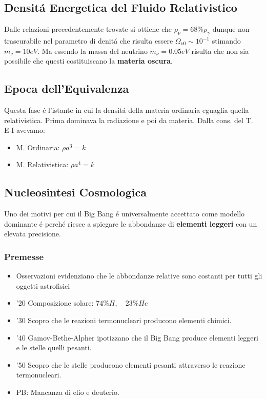 \documentclass[12pt, a4paper]{article}
\begin{document}
\subsection{Densit\'{a} Energetica del Fluido Relativistico}
Dalle relazioni precedentemente trovate si ottiene che $\rho_{\nu}=68\% \rho_{\gamma}$ dunque non trascurabile nel parametro di denit\'{a} che risulta essere $\Omega_{\nu0}\sim 10^{-1}$ stimando $m_{\nu}=10eV$. Ma essendo la massa del neutrino $m_{\nu}=0.05eV$ risulta che non sia possibile che questi costituiscano la \textbf{materia oscura}.
\subsection{Epoca dell'Equivalenza}
Questa fase \'{e} l'istante in cui la densit\'{a} della materia ordinaria eguaglia quella relativistica. Prima dominava la radiazione e poi da materia. Dalla cons. del T. E-I avevamo:
\begin{itemize}
    \item M. Ordinaria: $\rho a^3=k$
    \item M. Relativistica: $\rho a^4=k$
\end{itemize}
\subsection{Nucleosintesi Cosmologica}
Uno dei motivi per cui il Big Bang \'{e} universalmente accettato come modello dominante \'{e} perch\'{e} riesce a spiegare le abbondanze di \textbf{elementi leggeri} con un elevata precisione.
\subsubsection{Premesse}
\begin{itemize}
    \item Osservazioni evidenziano che le abbondanze relative sono costanti per tutti gli oggetti astrofisici
    \item '20 Composizione solare: $74\% H, \quad 23\% He$
    \item '30 Scopro che le reazioni termonucleari producono elementi chimici.
    \item '40 Gamov-Bethe-Alpher ipotizzano che il Big Bang produce elementi leggeri e le stelle quelli pesanti.
    \item '50 Scopro che le stelle producono elementi pesanti attraverso le reazione termonucleari.
    \item PB: Mancanza di elio e deuterio.
\end{itemize}
\end{document}
